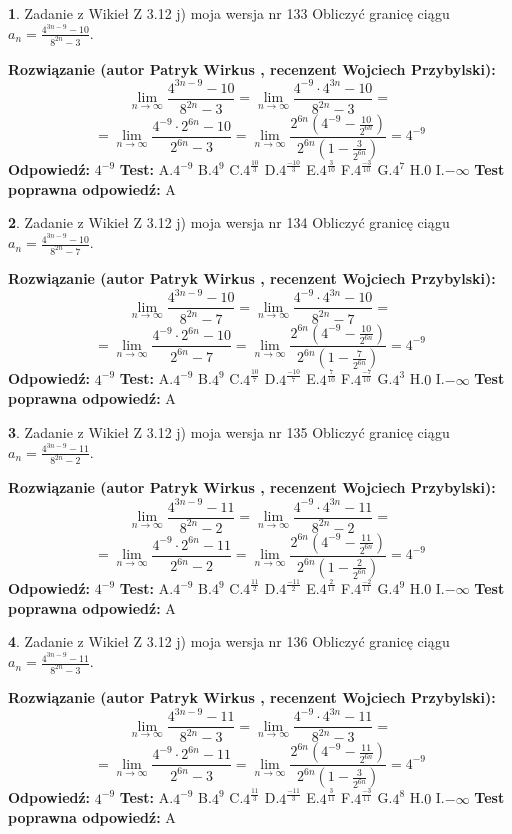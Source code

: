 \documentclass[12pt, a4paper]{article}
\theoremstyle{definition} %
\newtheorem{zad}{}
\newcommand{\zadStart}[1]{\begin{zad}#1\newline}
\newcommand{\zadStop}{\end{zad}}
\newcommand{\rozwStart}[2]{\noindent \textbf{Rozwiązanie (autor #1 , recenzent #2): }\newline}
\newcommand{\rozwStop}{\newline}
\newcommand{\odpStart}{\noindent \textbf{Odpowiedź:}\newline}
\newcommand{\odpStop}{\newline}
\newcommand{\testStart}{\noindent \textbf{Test:}\newline}
\newcommand{\testStop}{\newline}
\newcommand{\kluczStart}{\noindent \textbf{Test poprawna odpowiedź:}\newline}
\newcommand{\kluczStop}{\newline}
\begin{document}
\zadStart{Zadanie z Wikieł Z 3.12 j) moja wersja nr 133}
Obliczyć granicę ciągu $a_{n}=\frac{4^{3n-9}-10}{8^{2n}-3}$.
\zadStop
\rozwStart{Patryk Wirkus}{Wojciech Przybylski}
$$\lim\limits_{n\to\infty}\frac{4^{3n-9}-10}{8^{2n}-3}= \lim\limits_{n\to\infty}\frac{4^{-9} \cdot 4^{3n}-10}{8^{2n}-3}=$$
$$= \lim\limits_{n\to\infty}\frac{4^{-9} \cdot 2^{6n}-10}{2^{6n}-3}= \lim\limits_{n\to\infty}\frac{2^{6n}(4^{-9} - \frac{10}{2^{6n}})}{2^{6n}(1-\frac{3}{2^{6n}})}= 4^{-9}$$
\rozwStop
\odpStart
$4^{-9}$
\odpStop
\testStart
A.$4^{-9}$
B.$4^{9}$
C.$4^{\frac{10}{3}}$
D.$4^{\frac{-10}{3}}$
E.$4^{\frac{3}{10}}$
F.$4^{\frac{-3}{10}}$
G.$4^{7}$
H.$0$
I.$-\infty$
\testStop
\kluczStart
A
\kluczStop



\zadStart{Zadanie z Wikieł Z 3.12 j) moja wersja nr 134}
Obliczyć granicę ciągu $a_{n}=\frac{4^{3n-9}-10}{8^{2n}-7}$.
\zadStop
\rozwStart{Patryk Wirkus}{Wojciech Przybylski}
$$\lim\limits_{n\to\infty}\frac{4^{3n-9}-10}{8^{2n}-7}= \lim\limits_{n\to\infty}\frac{4^{-9} \cdot 4^{3n}-10}{8^{2n}-7}=$$
$$= \lim\limits_{n\to\infty}\frac{4^{-9} \cdot 2^{6n}-10}{2^{6n}-7}= \lim\limits_{n\to\infty}\frac{2^{6n}(4^{-9} - \frac{10}{2^{6n}})}{2^{6n}(1-\frac{7}{2^{6n}})}= 4^{-9}$$
\rozwStop
\odpStart
$4^{-9}$
\odpStop
\testStart
A.$4^{-9}$
B.$4^{9}$
C.$4^{\frac{10}{7}}$
D.$4^{\frac{-10}{7}}$
E.$4^{\frac{7}{10}}$
F.$4^{\frac{-7}{10}}$
G.$4^{3}$
H.$0$
I.$-\infty$
\testStop
\kluczStart
A
\kluczStop



\zadStart{Zadanie z Wikieł Z 3.12 j) moja wersja nr 135}
Obliczyć granicę ciągu $a_{n}=\frac{4^{3n-9}-11}{8^{2n}-2}$.
\zadStop
\rozwStart{Patryk Wirkus}{Wojciech Przybylski}
$$\lim\limits_{n\to\infty}\frac{4^{3n-9}-11}{8^{2n}-2}= \lim\limits_{n\to\infty}\frac{4^{-9} \cdot 4^{3n}-11}{8^{2n}-2}=$$
$$= \lim\limits_{n\to\infty}\frac{4^{-9} \cdot 2^{6n}-11}{2^{6n}-2}= \lim\limits_{n\to\infty}\frac{2^{6n}(4^{-9} - \frac{11}{2^{6n}})}{2^{6n}(1-\frac{2}{2^{6n}})}= 4^{-9}$$
\rozwStop
\odpStart
$4^{-9}$
\odpStop
\testStart
A.$4^{-9}$
B.$4^{9}$
C.$4^{\frac{11}{2}}$
D.$4^{\frac{-11}{2}}$
E.$4^{\frac{2}{11}}$
F.$4^{\frac{-2}{11}}$
G.$4^{9}$
H.$0$
I.$-\infty$
\testStop
\kluczStart
A
\kluczStop



\zadStart{Zadanie z Wikieł Z 3.12 j) moja wersja nr 136}
Obliczyć granicę ciągu $a_{n}=\frac{4^{3n-9}-11}{8^{2n}-3}$.
\zadStop
\rozwStart{Patryk Wirkus}{Wojciech Przybylski}
$$\lim\limits_{n\to\infty}\frac{4^{3n-9}-11}{8^{2n}-3}= \lim\limits_{n\to\infty}\frac{4^{-9} \cdot 4^{3n}-11}{8^{2n}-3}=$$
$$= \lim\limits_{n\to\infty}\frac{4^{-9} \cdot 2^{6n}-11}{2^{6n}-3}= \lim\limits_{n\to\infty}\frac{2^{6n}(4^{-9} - \frac{11}{2^{6n}})}{2^{6n}(1-\frac{3}{2^{6n}})}= 4^{-9}$$
\rozwStop
\odpStart
$4^{-9}$
\odpStop
\testStart
A.$4^{-9}$
B.$4^{9}$
C.$4^{\frac{11}{3}}$
D.$4^{\frac{-11}{3}}$
E.$4^{\frac{3}{11}}$
F.$4^{\frac{-3}{11}}$
G.$4^{8}$
H.$0$
I.$-\infty$
\testStop
\kluczStart
A
\kluczStop
\end{document}
